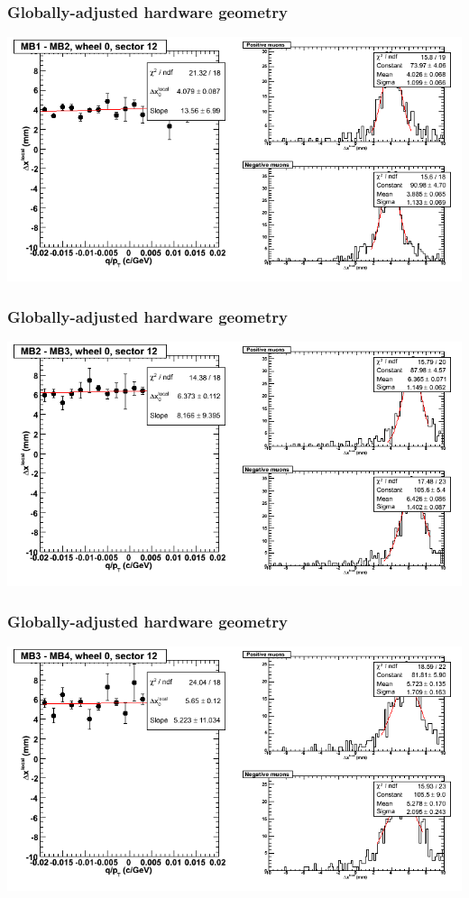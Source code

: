 \documentclass[compress]{beamer}
\begin{document}
\begin{frame}
\frametitle{Globally-adjusted hardware geometry}
\includegraphics[width=\linewidth]{NOV4_segdiffs_HW/dt13_resid_C_12_12.png}
\end{frame}

\begin{frame}
\frametitle{Globally-adjusted hardware geometry}
\includegraphics[width=\linewidth]{NOV4_segdiffs_HW/dt13_resid_C_12_23.png}
\end{frame}

\begin{frame}
\frametitle{Globally-adjusted hardware geometry}
\includegraphics[width=\linewidth]{NOV4_segdiffs_HW/dt13_resid_C_12_34.png}
\end{frame}
\end{document}
